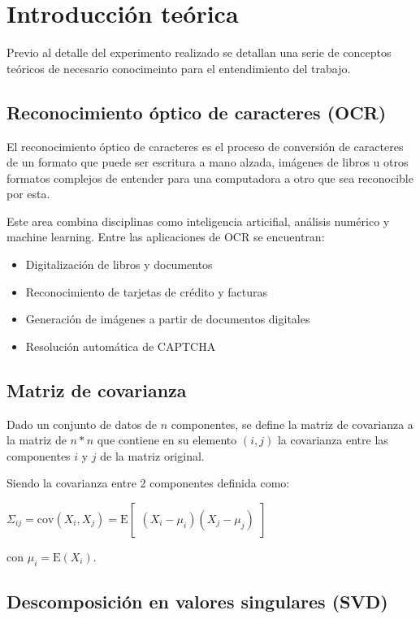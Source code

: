\section{Introducci\'on te\'orica}

Previo al detalle del experimento realizado se detallan una serie de conceptos te\'oricos de necesario
conocimeinto para el entendimiento del trabajo.

\subsection{Reconocimiento \'optico de caracteres (OCR)}

El reconocimiento \'optico de caracteres es el proceso de conversi\'on de caracteres de un formato que puede
ser escritura a mano alzada, im\'agenes de libros u otros formatos complejos de entender para una computadora
a otro que sea reconocible por esta.

Este area combina disciplinas como inteligencia articifial, an\'alisis num\'erico y machine learning. Entre
las aplicaciones de OCR se encuentran:

\begin{itemize}
  \item Digitalizaci\'on de libros y documentos
  \item Reconocimiento de tarjetas de cr\'edito y facturas
  \item Generaci\'on de im\'agenes a partir de documentos digitales
  \item Resoluci\'on autom\'atica de CAPTCHA
\end{itemize}

\subsection{Matriz de covarianza}

Dado un conjunto de datos de $n$ componentes, se define la matriz de covarianza a la matriz de $n*n$ que
contiene en su elemento $(i, j)$ la covarianza entre las componentes $i$ y $j$ de la matriz original.

Siendo la covarianza entre 2 componentes definida como:

$\Sigma_{ij} = \mathrm{cov}(X_i, X_j) = \mathrm{E}\begin{bmatrix} (X_i - \mu_i)(X_j - \mu_j) \end{bmatrix}$

con $\mu_i = \mathrm{E}(X_i)$.

\subsection{Descomposici\'on en valores singulares (SVD)}


